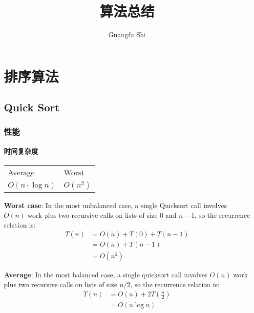 \documentclass[UTF8]{report}
\author{Guangfu Shi}
\title{算法总结}
\begin{document}
\chapter{排序算法}

\section{Quick Sort}

\subsection{性能}
\subsubsection{时间复杂度}

\begin{table}[ht]
\begin{center}
	
	\renewcommand{\arraystretch}{1.2}
	\begin{tabular}{ | l | l |}     	

	\hline

	Average & Worst \\
	\cline{1-2}

	\(O(n \cdot \log{n})\) 	& 		\(O(n^2)\)  \\

	\hline

	\end{tabular}
\end{center}
\label{tab:quicksort_time_complexity}
\end{table}

\textbf{Worst case}:  In the most unbalanced case, a single Quicksort call involves \(O(n)\) work plus two recursive calls on lists of size \(0\) and \(n-1\), so the recurrence relation is: 
\begin{equation}
\begin{split} 
T(n)& = O(n) + T(0) + T(n-1) \\
	& = O(n) + T(n-1) \\
	& = O(n^2)
\end{split}
\end{equation}

\textbf{Average}: In the most balanced case, a single quicksort call involves \(O(n)\) work plus two recursive calls on lists of size \(n/2\), so the recurrence relation is: 
\begin{equation}
\begin{split} 
T(n)& = O(n) + 2T(\frac{n}{2}) \\
	& = O(n \log{n}) 
\end{split}
\end{equation}
\end{document}
